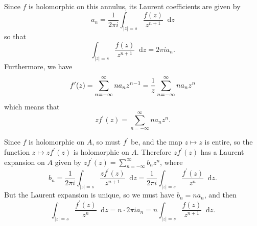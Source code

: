 \documentclass{article}
\newcommand\dif{\mathop{}\!\mathrm{d}}
\begin{document}
\begin{Answer}
Since $f$ is holomorphic on this annulus, its Laurent
coefficients are given by
$$
  a_n 
= \frac{1}{2 \pi i} 
  \int_{|z| = s}
    \frac{f(z)}{z^{n+1}}
    \dif z
$$
so that
$$
\int_{|z| = s}
    \frac{f(z)}{z^{n+1}}
    \dif z
= 2 \pi i a_n.
$$
Furthermore, we have
$$
   f^\prime(z)
= \sum_{n=-\infty}^\infty n a_n z^{n-1} \\
= \frac{1}{z} \sum_{n=-\infty}^{\infty} n a_n z^n 
$$
which means that
$$
z f^\prime(z) = \sum_{n=-\infty}^\infty n a_n z^n.
$$

Since $f$ is holomorphic on $A$, so must $f^\prime$ be, and the
map $z \mapsto z$ is entire, so the function $z \mapsto z f^\prime(z)$
is holomorphic on $A$. Therefore $z f^\prime(z)$ has a Laurent expansion on $A$
given by
$z f^\prime(z) = \sum_{n=-\infty}^\infty b_n z^n$, where
$$
  b_n
= \frac{1}{2 \pi i}
  \int_{|z| = s}
    \frac{z f^\prime(z)}{z^{n+1}}
    \dif z
= \frac{1}{2 \pi i}
  \int_{|z| = s}
    \frac{f^\prime(z)}{z^n}
    \dif z.
$$
But the Laurent expansion is unique, so we must have $b_n = n a_n$, and then
$$
  \int_{|z| = s}
    \frac{f^\prime(z)}{z^n}
    \dif z
= n \cdot 2 \pi i a_n
= n \int_{|z| = s}
      \frac{f(z)}{z^{n+1}}
      \dif z.
$$

\end{Answer}
\end{document}
